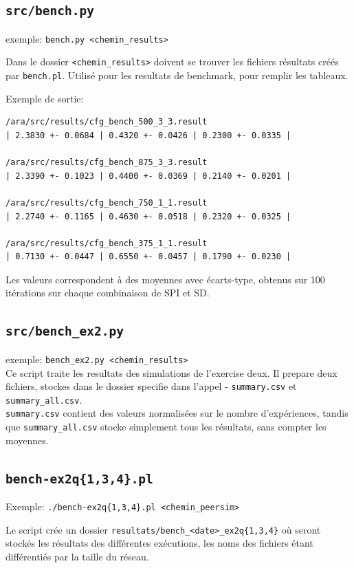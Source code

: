 \documentclass[a4paper]{article}
\begin{document}
\begin{appendix}
    \subsection{\texttt{src/bench.py}}
    exemple: \texttt{bench.py <chemin\_results>}

    Dans le dossier \texttt{<chemin\_results>} doivent se trouver les fichiers résultats créés par \texttt{bench.pl}. Utilisé pour les resultats de benchmark, pour remplir les tableaux.

Exemple de sortie:
\begin{verbatim}
/ara/src/results/cfg_bench_500_3_3.result
| 2.3830 +- 0.0684 | 0.4320 +- 0.0426 | 0.2300 +- 0.0335 |

/ara/src/results/cfg_bench_875_3_3.result
| 2.3390 +- 0.1023 | 0.4400 +- 0.0369 | 0.2140 +- 0.0201 |

/ara/src/results/cfg_bench_750_1_1.result
| 2.2740 +- 0.1165 | 0.4630 +- 0.0518 | 0.2320 +- 0.0325 |

/ara/src/results/cfg_bench_375_1_1.result
| 0.7130 +- 0.0447 | 0.6550 +- 0.0457 | 0.1790 +- 0.0230 |
\end{verbatim}
Les valeurs correspondent à des moyennes avec écarts-type, obtenus sur
100 itérations sur chaque combinaison de SPI et SD.



\subsection{\texttt{src/bench\_ex2.py}}
exemple: \texttt{bench\_ex2.py <chemin\_results>}\\
Ce script traite les resultats des simulations de l'exercise deux. Il prepare deux fichiers, stockes dans le dossier specifie dans l'appel - \texttt{summary.csv} et \texttt{summary\_all.csv}.\\

\texttt{summary.csv} contient des valeurs normalisées sur le nombre d'expériences, tandis que \texttt{summary\_all.csv} stocke simplement tous les résultats, sans compter les moyennes.


\subsection{\texttt{bench-ex2q\{1,3,4\}.pl}}
Exemple: \texttt{./bench-ex2q\{1,3,4\}.pl <chemin\_peersim>}

Le script crée un dossier \texttt{resultats/bench\_<date>\_ex2q\{1,3,4\}} où
seront stockés les résultats des différentes exécutions, les noms des fichiers
étant différentiés par la taille du réseau.


\end{appendix}
\end{document}
